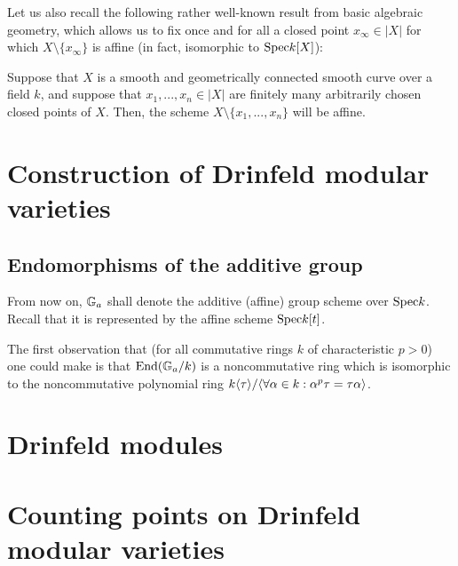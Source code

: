     Let us also recall the following rather well-known result from basic algebraic geometry, which allows us to fix once and for all a closed point $x_{\infty} \in |X|$ for which $X \setminus \{x_{\infty}\}$ is affine (in fact, isomorphic to $\mathrm{Spec} k[X]$):
    \begin{proposition}
        Suppose that $X$ is a smooth and geometrically connected smooth curve over a field $k$, and suppose that $x_1, ..., x_n \in |X|$ are finitely many arbitrarily chosen closed points of $X$. Then, the scheme $X \setminus \{x_1, ..., x_n\}$ will be affine.  
    \end{proposition}

    \section{Construction of Drinfeld modular varieties}
        \subsection{Endomorphisms of the additive group}
            \begin{convention}
                From now on, $\mathbb{G}_a$ shall denote the additive (affine) group scheme over $\mathrm{Spec} k$. Recall that it is represented by the affine scheme $\mathrm{Spec} k[t]$.
            \end{convention}
            \begin{remark}
                The first observation that (for all commutative rings $k$ of characteristic $p > 0$) one could make is that $\mathrm{End}(\mathbb{G}_a/k)$ is a noncommutative ring which is isomorphic to the noncommutative polynomial ring $k\langle\tau\rangle/\langle\forall \alpha \in k: \alpha^p \tau = \tau \alpha\rangle$. 
            \end{remark}
    
    \section{Drinfeld modules}
    
    \section{Counting points on Drinfeld modular varieties}